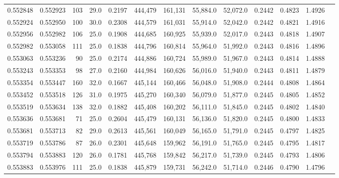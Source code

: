 \begin{tabular}{rrrrrrrrrrrrr}
0.552848 & 0.552923 &   103 & 29.0 &                                     0.2197 & 444,479 & 161,131 &  55,884.0 &  52,072.0 & 0.2442 & 0.4823 & 1.4926 \\
0.552924 & 0.552950 &   100 & 30.0 &                                     0.2308 & 444,579 & 161,031 &  55,914.0 &  52,042.0 & 0.2442 & 0.4821 & 1.4916 \\
0.552956 & 0.552982 &   106 & 25.0 &                                     0.1908 & 444,685 & 160,925 &  55,939.0 &  52,017.0 & 0.2443 & 0.4818 & 1.4907 \\
0.552982 & 0.553058 &   111 & 25.0 &                                     0.1838 & 444,796 & 160,814 &  55,964.0 &  51,992.0 & 0.2443 & 0.4816 & 1.4896 \\
0.553063 & 0.553236 &    90 & 25.0 &                                     0.2174 & 444,886 & 160,724 &  55,989.0 &  51,967.0 & 0.2443 & 0.4814 & 1.4888 \\
0.553243 & 0.553353 &    98 & 27.0 &                                     0.2160 & 444,984 & 160,626 &  56,016.0 &  51,940.0 & 0.2443 & 0.4811 & 1.4879 \\
0.553354 & 0.553447 &   160 & 32.0 &                                     0.1667 & 445,144 & 160,466 &  56,048.0 &  51,908.0 & 0.2444 & 0.4808 & 1.4864 \\
0.553452 & 0.553518 &   126 & 31.0 &                                     0.1975 & 445,270 & 160,340 &  56,079.0 &  51,877.0 & 0.2445 & 0.4805 & 1.4852 \\
0.553519 & 0.553634 &   138 & 32.0 &                                     0.1882 & 445,408 & 160,202 &  56,111.0 &  51,845.0 & 0.2445 & 0.4802 & 1.4840 \\
0.553636 & 0.553681 &    71 & 25.0 &                                     0.2604 & 445,479 & 160,131 &  56,136.0 &  51,820.0 & 0.2445 & 0.4800 & 1.4833 \\
0.553681 & 0.553713 &    82 & 29.0 &                                     0.2613 & 445,561 & 160,049 &  56,165.0 &  51,791.0 & 0.2445 & 0.4797 & 1.4825 \\
0.553719 & 0.553786 &    87 & 26.0 &                                     0.2301 & 445,648 & 159,962 &  56,191.0 &  51,765.0 & 0.2445 & 0.4795 & 1.4817 \\
0.553794 & 0.553883 &   120 & 26.0 &                                     0.1781 & 445,768 & 159,842 &  56,217.0 &  51,739.0 & 0.2445 & 0.4793 & 1.4806 \\
0.553883 & 0.553976 &   111 & 25.0 &                                     0.1838 & 445,879 & 159,731 &  56,242.0 &  51,714.0 & 0.2446 & 0.4790 & 1.4796 \\

\end{tabular}
